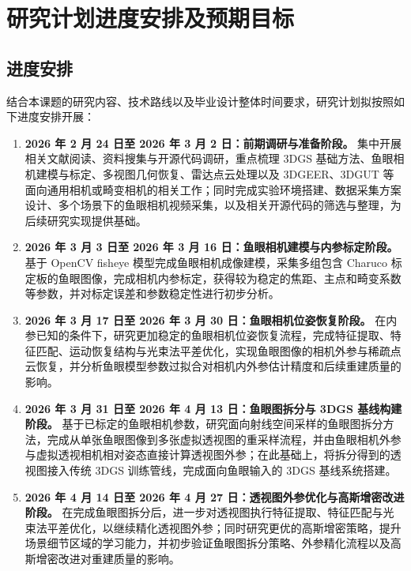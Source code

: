 \section{研究计划进度安排及预期目标}

\subsection{进度安排}

结合本课题的研究内容、技术路线以及毕业设计整体时间要求，研究计划拟按照如下进度安排开展：

\begin{enumerate}
    \item \textbf{2026 年 2 月 24 日至 2026 年 3 月 2 日：前期调研与准备阶段。} 集中开展相关文献阅读、资料搜集与开源代码调研，重点梳理 3DGS 基础方法、鱼眼相机建模与标定、多视图几何恢复、雷达点云处理以及 3DGEER、3DGUT 等面向通用相机或畸变相机的相关工作；同时完成实验环境搭建、数据采集方案设计、多个场景下的鱼眼相机视频采集，以及相关开源代码的筛选与整理，为后续研究实现提供基础。

    \item \textbf{2026 年 3 月 3 日至 2026 年 3 月 16 日：鱼眼相机建模与内参标定阶段。} 基于 OpenCV fisheye 模型完成鱼眼相机成像建模，采集多组包含 Charuco 标定板的鱼眼图像，完成相机内参标定，获得较为稳定的焦距、主点和畸变系数等参数，并对标定误差和参数稳定性进行初步分析。

    \item \textbf{2026 年 3 月 17 日至 2026 年 3 月 30 日：鱼眼相机位姿恢复阶段。} 在内参已知的条件下，研究更加稳定的鱼眼相机位姿恢复流程，完成特征提取、特征匹配、运动恢复结构与光束法平差优化，实现鱼眼图像的相机外参与稀疏点云恢复，并分析鱼眼模型参数过拟合对相机内外参估计精度和后续重建质量的影响。

    \item \textbf{2026 年 3 月 31 日至 2026 年 4 月 13 日：鱼眼图拆分与 3DGS 基线构建阶段。} 基于已标定的鱼眼相机参数，研究面向射线空间采样的鱼眼图拆分方法，完成从单张鱼眼图像到多张虚拟透视图的重采样流程，并由鱼眼相机外参与虚拟透视相机相对姿态直接计算透视图外参；在此基础上，将拆分得到的透视图接入传统 3DGS 训练管线，完成面向鱼眼输入的 3DGS 基线系统搭建。

    \item \textbf{2026 年 4 月 14 日至 2026 年 4 月 27 日：透视图外参优化与高斯增密改进阶段。} 在完成鱼眼图拆分后，进一步对透视图执行特征提取、特征匹配与光束法平差优化，以继续精化透视图外参；同时研究更优的高斯增密策略，提升场景细节区域的学习能力，并初步验证鱼眼图拆分策略、外参精化流程以及高斯增密改进对重建质量的影响。


\end{enumerate}
